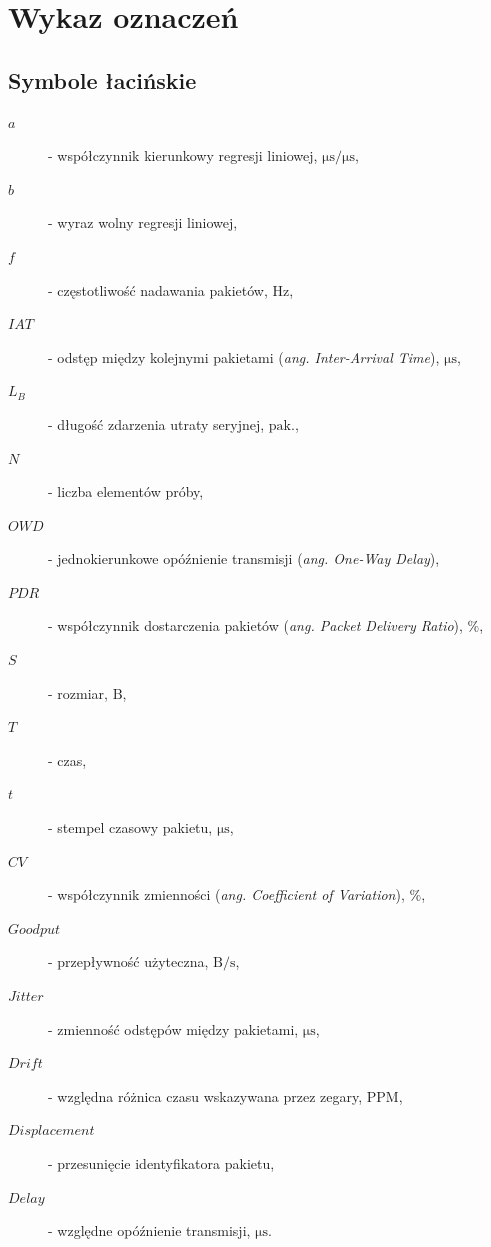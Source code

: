 \chapter*{Wykaz oznaczeń}

\section*{Symbole łacińskie}

\begin{description}
    \item[$a$] - współczynnik kierunkowy regresji liniowej, \(\mathrm{\mu s/\mu s}\), %
    \item[$b$] - wyraz wolny regresji liniowej, %
    \item[$f$] - częstotliwość nadawania pakietów, \(\mathrm{Hz}\), %
    \item[$IAT$] - odstęp między kolejnymi pakietami (\textit{ang. Inter-Arrival Time}), \(\mathrm{\mu s}\), %
    \item[$L_B$] - długość zdarzenia utraty seryjnej, \(\mathrm{pak.}\), %
    \item[$N$] - liczba elementów próby, %
    \item[$OWD$] - jednokierunkowe opóźnienie transmisji (\textit{ang. One-Way Delay}), %
    \item[$PDR$] - współczynnik dostarczenia pakietów (\textit{ang. Packet Delivery Ratio}), \(\mathrm{\%}\), %
    \item[$S$] - rozmiar, \(\mathrm{B}\), %
    \item[$T$] - czas, %
    \item[$t$] - stempel czasowy pakietu, \(\mathrm{\mu s}\), %
    \item[$CV$] - współczynnik zmienności (\textit{ang. Coefficient of Variation}), \(\mathrm{\%}\), %
    \item[$Goodput$] - przepływność użyteczna, \(\mathrm{B/s}\), %
    \item[$Jitter$] - zmienność odstępów między pakietami, \(\mathrm{\mu s}\), %
    \item[$Drift$] - względna różnica czasu wskazywana przez zegary, \(\mathrm{PPM}\), %
    \item[$Displacement$] - przesunięcie identyfikatora pakietu, %
    \item[$Delay$] - względne opóźnienie transmisji, \(\mathrm{\mu s}\). %
\end{description}

